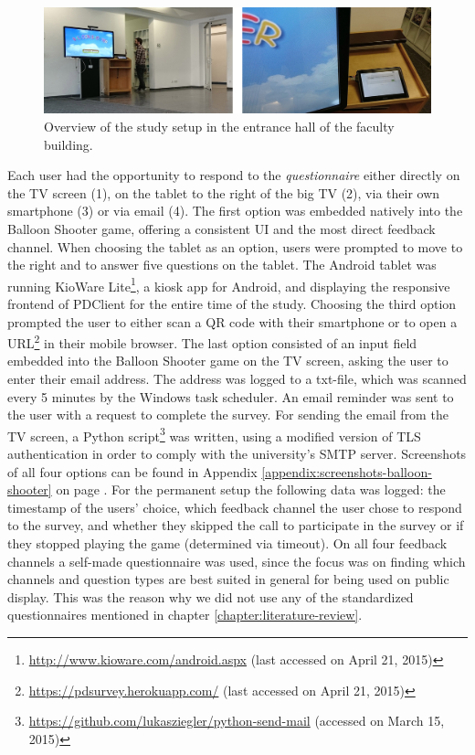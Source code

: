		\begin{figure}
		    \begin{center}
   \includegraphics[width=\columnwidth]{img/5_field-study/study-setup.jpg}
		    \end{center}
		 \caption{Overview of the study setup in the entrance hall of the faculty building.}
		 \label{fig:5-study-setup}
		\end{figure}

		Each user had the opportunity to respond to the \textit{questionnaire} either directly on the TV screen (1), on the tablet to the right of the big TV (2), via their own smartphone (3) or via email (4). The first option was embedded natively into the Balloon Shooter game, offering a consistent UI and the most direct feedback channel. When choosing the tablet as an option, users were prompted to move to the right and to answer five questions on the tablet. The Android tablet was running KioWare Lite\footnote{\url{http://www.kioware.com/android.aspx} (last accessed on April 21, 2015)}, a kiosk app for Android, and displaying the responsive frontend of PDClient for the entire time of the study. Choosing the third option prompted the user to either scan a QR code with their smartphone or to open a URL\footnote{\url{https://pdsurvey.herokuapp.com/} (last accessed on April 21, 2015)} in their mobile browser. The last option consisted of an input field embedded into the Balloon Shooter game on the TV screen, asking the user to enter their email address. The address was logged to a txt-file, which was scanned every 5 minutes by the Windows task scheduler. An email reminder was sent to the user with a request to complete the survey. For sending the email from the TV screen, a Python script\footnote{\url{https://github.com/lukasziegler/python-send-mail} (accessed on March 15, 2015)} was written, using a modified version of TLS authentication in order to comply with the university's SMTP server. Screenshots of all four options can be found in Appendix \ref{appendix:screenshots-balloon-shooter} on page \pageref{appendix:screenshots-balloon-shooter}.
		For the permanent setup the following data was logged: the timestamp of the users' choice, which feedback channel the user chose to respond to the survey, and whether they skipped the call to participate in the survey or if they stopped playing the game (determined via timeout). 
		On all four feedback channels a self-made questionnaire was used, since the focus was on finding which channels and question types are best suited in general for being used on public display. This was the reason why we did not use any of the standardized questionnaires mentioned in chapter \ref{chapter:literature-review}. 

